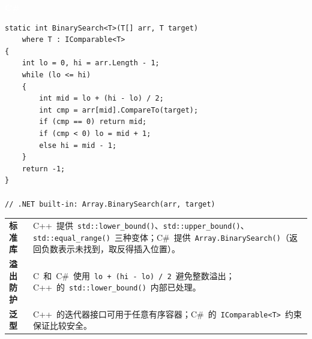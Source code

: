 \documentclass[12pt,a4paper,fontset=fandol]{ctexbook}
\newcommand{\csharplabel}{%
  \noindent\begin{tcolorbox}[sharp corners,colback=csharpheadbg,colframe=csharpheadbg,
    left=6pt,right=6pt,top=2pt,bottom=2pt,boxrule=0pt]
  \textcolor{white}{\small\bfseries\sffamily C\#}\end{tcolorbox}%
}
\newcommand{\Fn}[1]{\texttt{#1()}}
\newcommand{\Tp}[1]{\texttt{#1}}
\begin{document}
\csharplabel
\begin{lstlisting}[style=csharpstyle]
static int BinarySearch<T>(T[] arr, T target)
    where T : IComparable<T>
{
    int lo = 0, hi = arr.Length - 1;
    while (lo <= hi)
    {
        int mid = lo + (hi - lo) / 2;
        int cmp = arr[mid].CompareTo(target);
        if (cmp == 0) return mid;
        if (cmp < 0) lo = mid + 1;
        else hi = mid - 1;
    }
    return -1;
}

// .NET built-in: Array.BinarySearch(arr, target)
\end{lstlisting}

\begin{compare}
\begin{tabularx}{\textwidth}{l>{\raggedright\arraybackslash}X}
  \textbf{标准库} & C++~提供~\Fn{std::lower\_bound}、\Fn{std::upper\_bound}、\Fn{std::equal\_range}~三种变体；C\#~提供~\Fn{Array.BinarySearch}（返回负数表示未找到，取反得插入位置）。\\
  \textbf{溢出防护} & C~和~C\#~使用~\texttt{lo + (hi - lo) / 2}~避免整数溢出；C++~的~\Fn{std::lower\_bound}~内部已处理。\\
  \textbf{泛型} & C++~的迭代器接口可用于任意有序容器；C\#~的~\Tp{IComparable<T>}~约束保证比较安全。\\
\end{tabularx}
\end{compare}
\end{document}

